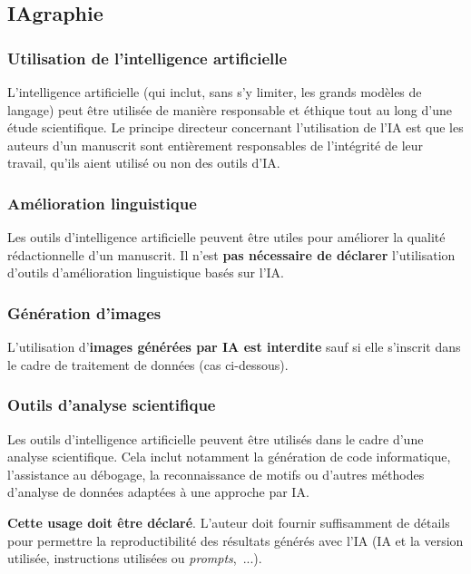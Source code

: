 \subsection{IAgraphie}

\subsubsection{Utilisation de l'intelligence artificielle}

L'intelligence artificielle (qui inclut, sans s'y limiter, les grands modèles de langage) peut être utilisée de manière responsable et éthique tout au long d'une étude scientifique. Le principe directeur concernant l'utilisation de l'IA est que les auteurs d'un manuscrit sont entièrement responsables de l'intégrité de leur travail, qu'ils aient utilisé ou non des outils d'IA. 

\subsubsection{Amélioration linguistique}

Les outils d'intelligence artificielle peuvent être utiles pour améliorer la qualité rédactionnelle d'un manuscrit. Il n'est \textbf{pas nécessaire de déclarer} l'utilisation d'outils d'amélioration linguistique basés sur l'IA. 

\subsubsection{Génération d'images}

L'utilisation d'\textbf{images générées par IA est interdite} sauf si elle s'inscrit dans le cadre de traitement de données (cas ci-dessous).

\subsubsection{Outils d'analyse scientifique}

Les outils d'intelligence artificielle peuvent être utilisés dans le cadre d'une analyse scientifique. Cela inclut notamment la génération de code informatique, l'assistance au débogage, la reconnaissance de motifs ou d'autres méthodes d'analyse de données adaptées à une approche par IA.

\textbf{Cette usage doit être déclaré}. L'auteur doit fournir suffisamment de détails pour permettre la
reproductibilité des résultats générés avec l'IA (IA et la version utilisée, instructions utilisées ou
\mbox{\textit{prompts}, ...).} 


